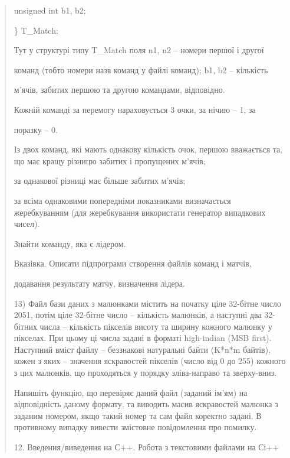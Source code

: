 \documentclass[]{article}
\begin{document}
\begin{quote}
unsigned int b1, b2;

\} T\_Match;

Тут у структурі типу T\_Match поля n1, n2 -- номери першої і другої

команд (тобто номери назв команд у файлі команд); b1, b2 -- кількість

м'ячів, забитих першою та другою командами, відповідно.

Кожній команді за перемогу нараховується 3 очки, за нічию -- 1, за

поразку -- 0.

Із двох команд, які мають однакову кількість очок, першою вважається та,
що має кращу різницю забитих і пропущених м'ячів;

за однакової різниці має більше забитих м'ячів;

за всіма однаковими попередніми показниками визначається жеребкуванням
(для жеребкування використати генератор випадкових чисел).

Знайти команду, яка є лідером.

Вказівка. Описати підпрограми створення файлів команд і матчів,

додавання результату матчу, визначення лідера.

13) Файл бази даних з малюнками містить на початку ціле 32-бітне число
2051, потім ціле 32-бітне число -- кількість малюнків, а наступні два
32-бітних числа -- кількість пікселів висоту та ширину кожного малюнку у
пікселах. При цьому ці числа задані в форматі high-indian (MSB first).
Наступний вміст файлу -- беззнакові натуральні байти (K*n*m байтів),
кожен з яких -- значення яскравостей пікселів (число від 0 до 255)
кожного з цих малюнків, що проходяться у порядку зліва-направо та
зверху-вниз.

Напишіть функцію, що перевіряє даний файл (заданий ім'ям) на
відповідність даному формату, та виводить масив яскравостей малюнка з
заданим номером, якщо такий номер та сам файл коректно задані. В
противному випадку вивести змістовне повідомлення про помилку.

12. Введення/виведення на С++. Робота з текстовими файлами на Сі++
\end{quote}
\end{document}
